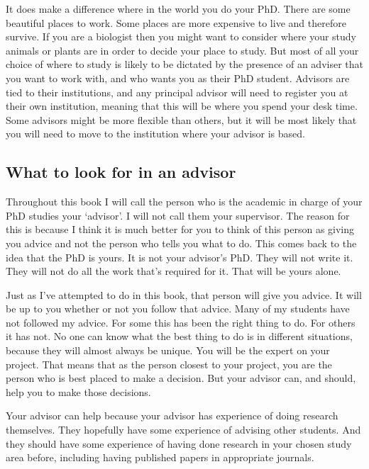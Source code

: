 \documentclass[
]{krantz}
\begin{document}
It does make a difference where in the world you do your PhD. There are some beautiful places to work. Some places are more expensive to live and therefore survive. If you are a biologist then you might want to consider where your study animals or plants are in order to decide your place to study. But most of all your choice of where to study is likely to be dictated by the presence of an adviser that you want to work with, and who wants you as their PhD student. Advisors are tied to their institutions, and any principal advisor will need to register you at their own institution, meaning that this will be where you spend your desk time. Some advisors might be more flexible than others, but it will be most likely that you will need to move to the institution where your advisor is based.

\hypertarget{what-to-look-for-in-an-advisor}{%
\subsection{What to look for in an advisor}\label{what-to-look-for-in-an-advisor}}

Throughout this book I will call the person who is the academic in charge of your PhD studies your `advisor'. I will not call them your supervisor. The reason for this is because I think it is much better for you to think of this person as giving you advice and not the person who tells you what to do. This comes back to the idea that the PhD is yours. It is not your advisor's PhD. They will not write it. They will not do all the work that's required for it. That will be yours alone.

Just as I've attempted to do in this book, that person will give you advice. It will be up to you whether or not you follow that advice. Many of my students have not followed my advice. For some this has been the right thing to do. For others it has not. No one can know what the best thing to do is in different situations, because they will almost always be unique. You will be the expert on your project. That means that as the person closest to your project, you are the person who is best placed to make a decision. But your advisor can, and should, help you to make those decisions.

Your advisor can help because your advisor has experience of doing research themselves. They hopefully have some experience of advising other students. And they should have some experience of having done research in your chosen study area before, including having published papers in appropriate journals.
\end{document}

